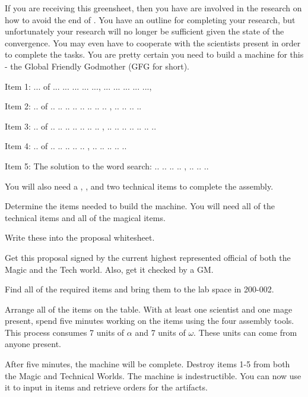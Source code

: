 \documentclass[green]{guildcamp3}
\begin{document}
\name{\gSaveTheWorldMages{}}

If you are receiving this greensheet, then you have are involved in the research on how to avoid the end of \bMagicWorld{}. You have an outline for completing your research, but unfortunately your research will no longer be sufficient given the state of the convergence. You may even have to cooperate with the scientists present in order to complete the tasks. You are pretty certain you need to build a machine for this - the Global Friendly Godmother (GFG for short).

Item 1: ... of ... ... ... ... ..., ... ... ... ... ...,

Item 2: .. of .. .. .. .. .. .. .. ..  ,  .. .. .. ..

Item 3: .. of .. .. .. .. .. .. ..  , .. .. .. .. .. .. ..

Item 4: .. of .. .. .. .. ..  ,  .. .. .. .. ..

Item 5: The solution to the word search: .. .. .. ..  ,  .. .. ..



You will also need a \iCauldron{}, \iPlumbicRod{}, and two technical items to complete the assembly. 


\begin{enum}[Directions]
  \item Determine the items needed to build the machine. You will need all of the technical items and all of the magical items. 
  \item Write these into the proposal whitesheet. 
  \item Get this proposal signed by the current highest represented official of both the Magic and the Tech world. Also, get it checked by a GM.
  \item Find all of the required items and bring them to the lab space in 200-002.
  \item Arrange all of the items on the table. With at least one scientist and one mage present, spend five minutes working on the items using the four assembly tools. This process consumes 7 units of $\alpha$ and 7 units of $\omega$. These units can come from anyone present. 
  \item After five minutes, the machine will be complete. Destroy items 1-5 from both the Magic and Technical Worlds. The machine is indestructible. You can now use it to input in items and retrieve orders for the artifacts. 
  
\end{enum}
\end{document}
